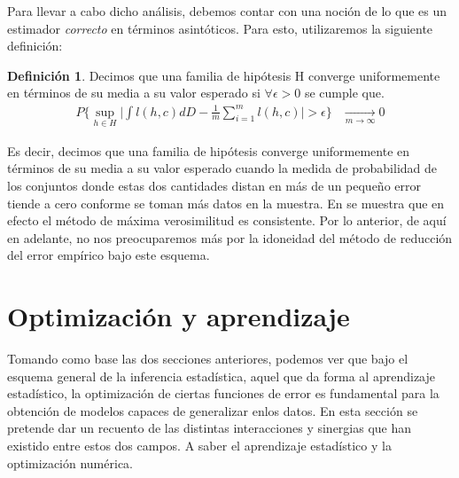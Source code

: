 \documentclass{book}
\theoremstyle{plain}
\theoremstyle{definition}
\newtheorem{defn}{Definición}[section]
\theoremstyle{remark}
\begin{document}
Para llevar a cabo dicho análisis, debemos contar con una noción de lo que es un estimador \emph{correcto} en términos asintóticos. Para esto, utilizaremos la siguiente definición:

\begin{defn}
Decimos que una familia de hipótesis H converge uniformemente en términos de su media a su valor esperado si $\forall\epsilon>0$ se cumple que.
\begin{equation*}
\begin{split}
P\Bigg\{\displaystyle\sup_{h\in H}\bigg|\int l(h,c)dD - \frac{1}{m}\displaystyle\sum_{i = 1}^ml(h,c)\bigg|>\epsilon\Bigg\} & \xrightarrow[m\rightarrow\infty]{} 0
\end{split}
\end{equation*}

Es decir, decimos que una familia de hipótesis converge uniformemente en términos de su media a su valor esperado cuando la medida de probabilidad de los conjuntos donde estas dos cantidades distan en más de un pequeño error tiende a cero conforme se toman más datos en la muestra. En \cite{VAPNIK1} se muestra que en efecto el método de máxima verosimilitud es consistente. Por lo anterior, de aquí en adelante, no nos preocuparemos más por la idoneidad del método de reducción del error empírico bajo este esquema. 
\end{defn}

\newpage

\section{Optimización y aprendizaje}

Tomando como base las dos secciones anteriores, podemos ver que bajo el esquema general de la inferencia estadística, aquel que da forma al aprendizaje estadístico, la optimización de ciertas funciones de error es fundamental para la obtención de modelos capaces de generalizar enlos datos. En esta sección se pretende dar un recuento de las distintas interacciones y sinergias que han existido entre estos dos campos. A saber el aprendizaje estadístico y la optimización numérica. 
\end{document}
